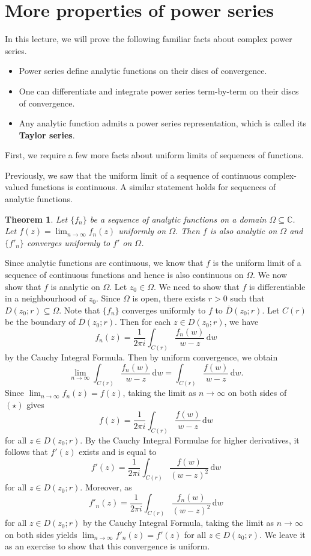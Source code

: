 \documentclass[10pt]{article}
\makeatletter
\newcommand{\C}{\mathbb{C}}
\newcommand{\dd}{\,\mathrm{d}}
\theoremstyle{newstyle}
\newtheorem{thm}{Theorem}[section]
\newenvironment{pf}[1][\proofname]{\par
  \pushQED{\qed}%
  \normalfont \topsep0\p@\relax
  \trivlist
  \item[\hskip\labelsep\scshape
  #1\@addpunct{.}]\ignorespaces
}{%
  \popQED\endtrivlist\@endpefalse
}
\makeatother
\begin{document}
\newpage 
\section{More properties of power series}

In this lecture, we will prove the following familiar facts about complex power series. 
\begin{itemize}
    \item Power series define analytic functions on their discs of convergence. 
    \item One can differentiate and integrate power series term-by-term on their discs of convergence.
    \item Any analytic function admits a power series representation, which is called its 
    {\bf Taylor series}.
\end{itemize}
First, we require a few more facts about uniform limits of sequences of functions. 

Previously, we saw that the uniform limit of a sequence of continuous complex-valued functions 
is continuous. A similar statement holds for sequences of analytic functions. 

\begin{thm}
Let $\{f_n\}$ be a sequence of analytic functions on a domain $\Omega \subseteq \C$. Let 
$f(z) = \lim_{n\to\infty} f_n(z)$ uniformly on $\Omega$. Then $f$ is also analytic on $\Omega$ 
and $\{f'_n\}$ converges uniformly to $f'$ on $\Omega$.
\end{thm}
\begin{pf}
Since analytic functions are continuous, we know that $f$ is the uniform limit of a sequence of 
continuous functions and hence is also continuous on $\Omega$. We now show that $f$ is analytic 
on $\Omega$. Let $z_0 \in \Omega$. We need to show that $f$ is differentiable in a neighbourhood 
of $z_0$. Since $\Omega$ is open, there exists $r > 0$ such that $D(z_0; r) \subseteq \Omega$. 
Note that $\{f_n\}$ converges uniformly to $f$ to $\overline{D}(z_0; r)$. Let $C(r)$ be 
the boundary of $\overline{D}(z_0; r)$. Then for each $z \in D(z_0; r)$, we have 
\[ f_n(z) = \frac{1}{2\pi i} \int_{C(r)} \frac{f_n(w)}{w-z}\dd w \tag{$\star$} \]
by the Cauchy Integral Formula. Then by uniform convergence, we obtain 
\[ \lim_{n\to\infty} \int_{C(r)} \frac{f_n(w)}{w-z}\dd w = \int_{C(r)} \frac{f(w)}{w-z}\dd w. \]
Since $\lim_{n\to\infty} f_n(z) = f(z)$, taking the limit as $n \to \infty$ on both sides of 
$(\star)$ gives 
\[ f(z) = \frac{1}{2\pi i} \int_{C(r)} \frac{f(w)}{w-z}\dd w \]
for all $z \in D(z_0; r)$. By the Cauchy Integral Formulae for higher derivatives, it follows that 
$f'(z)$ exists and is equal to 
\[ f'(z) = \frac{1}{2\pi i} \int_{C(r)} \frac{f(w)}{(w-z)^2}\dd w \]
for all $z \in D(z_0; r)$. Moreover, as 
\[ f'_n(z) = \frac{1}{2\pi i} \int_{C(r)} \frac{f_n(w)}{(w-z)^2}\dd w \]
for all $z \in D(z_0; r)$ by the Cauchy Integral Formula, taking the limit as 
$n \to \infty$ on both sides yields $\lim_{n\to\infty} f'_n(z) = f'(z)$ for all $z \in D(z_0; r)$. 
We leave it as an exercise to show that this convergence is uniform. 
\end{pf}
\end{document}
